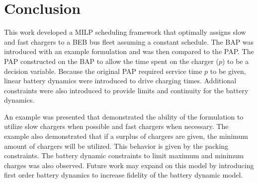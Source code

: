 \documentclass[letterpaper, 10pt, conference]{IEEEtran}
\begin{document}
\section{Conclusion}
\label{sec:conclusion}
This work developed a MILP scheduling framework that optimally assigns slow and fast chargers to a BEB bus fleet assuming a constant schedule. The BAP was introduced with an example formulation and was then compared to the PAP. The PAP constructed on the BAP to allow the time spent on the charger (\(p\)) to be a decision variable. Because the original PAP required service time \(p\) to be given, linear battery dynamics were introduced to drive charging times. Additional constraints were also introduced to provide limits and continuity for the battery dynamics.

An example was presented that demonstrated the ability of the formulation to utilize slow chargers when possible and fast chargers when necessary. The example also demonstrated that if a surplus of chargers are given, the minimum amount of chargers will be utilized. This behavior is given by the packing constraints. The battery dynamic constraints to limit maximum and minimum charges was also observed. Future work may expand on this model by introducing first order battery dynamics to increase fidelity of the battery dynamic model.




\end{document}
